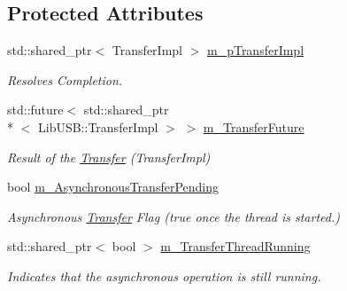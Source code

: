 \subsection*{Protected Attributes}
\begin{DoxyCompactItemize}
\item 
std\-::shared\-\_\-ptr$<$ Transfer\-Impl $>$ \hyperlink{class_lib_u_s_b_1_1_transfer_a09688b01c634cfdb522fb0c229da7308}{m\-\_\-p\-Transfer\-Impl}
\begin{DoxyCompactList}\small\item\em Resolves Completion. \end{DoxyCompactList}\item 
\hypertarget{class_lib_u_s_b_1_1_transfer_a5ea1bdbaa5248a43d4f7b053220677a4}{std\-::future$<$ std\-::shared\-\_\-ptr\\*
$<$ Lib\-U\-S\-B\-::\-Transfer\-Impl $>$ $>$ \hyperlink{class_lib_u_s_b_1_1_transfer_a5ea1bdbaa5248a43d4f7b053220677a4}{m\-\_\-\-Transfer\-Future}}\label{class_lib_u_s_b_1_1_transfer_a5ea1bdbaa5248a43d4f7b053220677a4}

\begin{DoxyCompactList}\small\item\em Result of the \hyperlink{class_lib_u_s_b_1_1_transfer}{Transfer} (Transfer\-Impl) \end{DoxyCompactList}\item 
\hypertarget{class_lib_u_s_b_1_1_transfer_a86498992dc1076d2d14ca8a646746059}{bool \hyperlink{class_lib_u_s_b_1_1_transfer_a86498992dc1076d2d14ca8a646746059}{m\-\_\-\-Asynchronous\-Transfer\-Pending}}\label{class_lib_u_s_b_1_1_transfer_a86498992dc1076d2d14ca8a646746059}

\begin{DoxyCompactList}\small\item\em Asynchronous \hyperlink{class_lib_u_s_b_1_1_transfer}{Transfer} Flag (true once the thread is started.) \end{DoxyCompactList}\item 
\hypertarget{class_lib_u_s_b_1_1_transfer_aa2690da75e400b433123340d3c160f0c}{std\-::shared\-\_\-ptr$<$ bool $>$ \hyperlink{class_lib_u_s_b_1_1_transfer_aa2690da75e400b433123340d3c160f0c}{m\-\_\-\-Transfer\-Thread\-Running}}\label{class_lib_u_s_b_1_1_transfer_aa2690da75e400b433123340d3c160f0c}

\begin{DoxyCompactList}\small\item\em Indicates that the asynchronous operation is still running. \end{DoxyCompactList}\end{DoxyCompactItemize}


